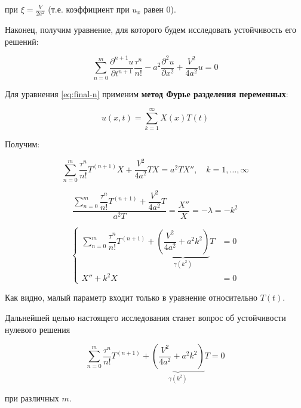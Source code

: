 при $\xi = \frac{V}{2a^2}$ (т.е. коэффициент при $u_x$ равен $0$).

Наконец, получим уравнение, для которого будем исследовать устойчивость его решений:

\begin{equation}\label{eq:final-n}
\sum\limits_{n=0}^{m} \dfrac{\partial^{n+1} u}{\partial t^{n+1}} \dfrac{\tau^n}{n!} - a^2 \dfrac{\partial^2 u}{\partial x^2} + \dfrac{V^2}{4a^2} u = 0
\end{equation}

Для уравнения \ref{eq:final-n} применим \textbf{метод Фурье разделения переменных}:

\begin{equation}
u(x,t) = \sum\limits_{k=1}^{\infty} X(x)T(t)
\end{equation}

Получим:

\begin{equation}
\sum\limits_{n=0}^{m} \dfrac{\tau^n}{n!} T^{(n+1)} X + \dfrac{V^2}{4a^2} T X =a^2 T X'', \quad k=1,\dots,\infty
\end{equation}

\begin{equation}
\dfrac{\sum\limits_{n=0}^{m} \dfrac{\tau^n}{n!} T^{(n+1)} + \dfrac{V^2}{4a^2} T}{a^2 T} = \dfrac{X''}{X} = -\lambda = -k^2
\end{equation}

\begin{equation}
\left\{
\begin{aligned}
\sum\limits_{n=0}^{m} \dfrac{\tau^n}{n!} T^{(n+1)} + \underbrace{ \left( \dfrac{V^2}{4a^2} + a^2 k^2 \right)}_{\gamma(k^2)} T & = 0\\
X'' + k^2 X & = 0
\end{aligned}
\right.
\end{equation}

Как видно, малый параметр входит только в уравнение относительно $T(t)$.

Дальнейшей целью настоящего исследования станет вопрос об устойчивости нулевого решения

\begin{equation}
\sum\limits_{n=0}^{m} \dfrac{\tau^n}{n!} T^{(n+1)} + \underbrace{ \left( \dfrac{V^2}{4a^2} + a^2 k^2 \right)}_{\gamma(k^2)} T = 0
\end{equation}

при различных $m$.